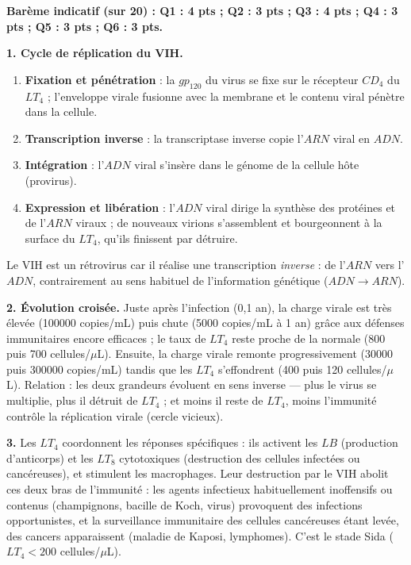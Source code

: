 \documentclass[11pt]{article}
\newcommand{\cle}[1]{{\popxbold\color{popdark}#1}}
\begin{document}
\begin{corrige}

\textbf{Barème indicatif (sur 20) : Q1 : 4 pts ; Q2 : 3 pts ; Q3 : 4 pts ; Q4 : 3 pts ; Q5 : 3 pts ; Q6 : 3 pts.}

\textbf{1. Cycle de réplication du VIH.}
\begin{enumerate}
\item \textbf{Fixation et pénétration} : la $gp_{120}$ du virus se fixe sur le récepteur $CD_4$ du $LT_4$ ; l'enveloppe virale fusionne avec la membrane et le contenu viral pénètre dans la cellule.
\item \textbf{Transcription inverse} : la transcriptase inverse copie l'$ARN$ viral en $ADN$.
\item \textbf{Intégration} : l'$ADN$ viral s'insère dans le génome de la cellule hôte (provirus).
\item \textbf{Expression et libération} : l'$ADN$ viral dirige la synthèse des protéines et de l'$ARN$ viraux ; de nouveaux virions s'assemblent et bourgeonnent à la surface du $LT_4$, qu'ils finissent par détruire.
\end{enumerate}
Le VIH est un \cle{rétrovirus} car il réalise une transcription \emph{inverse} : de l'$ARN$ vers l'$ADN$, contrairement au sens habituel de l'information génétique ($ADN \rightarrow ARN$).

\textbf{2. Évolution croisée.} Juste après l'infection (0,1 an), la charge virale est très élevée (\num{100000} copies/mL) puis chute (\num{5000} copies/mL à 1 an) grâce aux défenses immunitaires encore efficaces ; le taux de $LT_4$ reste proche de la normale (800 puis 700 cellules/$\mu$L). Ensuite, la charge virale remonte progressivement (\num{30000} puis \num{300000} copies/mL) tandis que les $LT_4$ s'effondrent (400 puis 120 cellules/$\mu$L). Relation : les deux grandeurs évoluent en sens inverse — plus le virus se multiplie, plus il détruit de $LT_4$ ; et moins il reste de $LT_4$, moins l'immunité contrôle la réplication virale (cercle vicieux).

\textbf{3.} Les $LT_4$ coordonnent les réponses spécifiques : ils activent les $LB$ (production d'anticorps) et les $LT_8$ cytotoxiques (destruction des cellules infectées ou cancéreuses), et stimulent les macrophages. Leur destruction par le VIH abolit ces deux bras de l'immunité : les agents infectieux habituellement inoffensifs ou contenus (champignons, bacille de Koch, virus) provoquent des \cle{infections opportunistes}, et la surveillance immunitaire des cellules cancéreuses étant levée, des cancers apparaissent (maladie de Kaposi, lymphomes). C'est le stade Sida ($LT_4 < 200$ cellules/$\mu$L).


\end{corrige}
\end{document}

